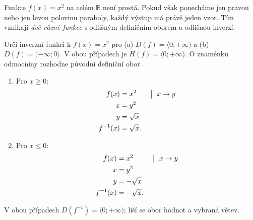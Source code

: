\documentclass[11pt,a4paper]{article}
\begin{document}

Funkce $f(x)=x^2$ na celém $\mathbb R$ není prostá. Pokud však ponecháme jen pravou nebo jen levou polovinu paraboly, každý výstup má právě jeden vzor. Tím vznikají \emph{dvě různé funkce} s odlišným definičním oborem a odlišnou inverzí.

\begin{prikladReseniBox}[title={Příklad 1}]
Urči inverzní funkci k $f(x)=x^2$ pro (a) $D(f)=\langle0;+\infty)$ a (b) $D(f)=(-\infty;0\rangle$.
\tcblower
V obou případech je $H(f)=\langle0;+\infty)$. O znaménku odmocniny rozhodne původní definiční obor.
\begin{enumerate}[label=\alph*)]
\item Pro $x\ge0$:
\[
\begin{aligned}
f(x)&=x^2 &&\bigm|\ x\to y\\
x&=y^2\\
y&=\sqrt{x}\\
f^{-1}(x)&=\sqrt{x}.
\end{aligned}
\]
\item Pro $x\le0$:
\[
\begin{aligned}
f(x)&=x^2 &&\bigm|\ x\to y\\
x&=y^2\\
y&=-\sqrt{x}\\
f^{-1}(x)&=-\sqrt{x}.
\end{aligned}
\]
\end{enumerate}
V obou případech $D(f^{-1})=\langle0;+\infty)$; liší se obor hodnot a vybraná větev.
\end{prikladReseniBox}
\end{document}
